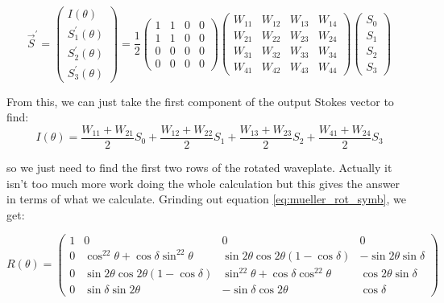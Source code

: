 \documentclass{article}
\begin{document}
\begin{equation}
    \label{eq:sys_matrix_deriv1}
    \vec{S}^\prime = 
    \begin{pmatrix}
        I(\theta) \\
        S^\prime_1(\theta) \\
        S^\prime_2(\theta) \\
        S^\prime_3(\theta)
    \end{pmatrix}
    = 
    \frac{1}{2}
    \begin{pmatrix}
        1 & 1 & 0 & 0 \\
        1 & 1 & 0 & 0 \\
        0 & 0 & 0 & 0 \\
        0 & 0 & 0 & 0 
    \end{pmatrix}
    \begin{pmatrix}
        W_{11} & W_{12} & W_{13} & W_{14} \\
        W_{21} & W_{22} & W_{23} & W_{24} \\
        W_{31} & W_{32} & W_{33} & W_{34} \\
        W_{41} & W_{42} & W_{43} & W_{44}
    \end{pmatrix}
    \begin{pmatrix}
        S_0 \\
        S_1 \\
        S_2 \\
        S_3 
    \end{pmatrix} 
\end{equation}

From this, we can just take the first component of the output Stokes vector to find:
\begin{equation}
    \label{eq:Intense_theta_abs}
    I(\theta) = \frac{W_{11}+W_{21}}{2}S_0 + \frac{W_{12}+W_{22}}{2}S_1 + \frac{W_{13}+W_{23}}{2}S_2 + \frac{W_{41}+W_{24}}{2}S_3
\end{equation}

\noindent so we just need to find the first two rows of the rotated waveplate. Actually it isn't too much more work doing the whole calculation but this gives the answer in terms of what we calculate. Grinding out equation \ref{eq:mueller_rot_symb}, we get:

\begin{equation}
    \label{eq:mueller_rot_explicit}
    R(\theta) = \begin{pmatrix}
        1 & 0 & 0 & 0 \\
        0 & \cos^22\theta + \cos\delta\sin^22\theta & \sin2\theta\cos2\theta(1-\cos\delta) & -\sin2\theta\sin\delta \\
        0 &  \sin2\theta\cos2\theta(1-\cos\delta) & \sin^22\theta + \cos\delta\cos^22\theta & \cos2\theta\sin\delta \\
        0 & \sin\delta\sin2\theta & -\sin\delta\cos2\theta & \cos\delta
    \end{pmatrix}
\end{equation}
\end{document}
